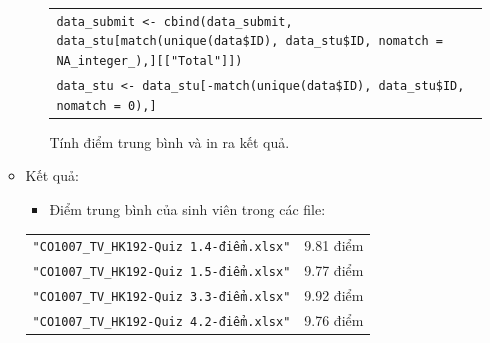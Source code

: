 \documentclass[a4paper]{article}
\theoremstyle{definition}
\begin{document}
\begin{enumerate}[a)]
\begin{itemize}
\begin{itemize}
\begin{center}
\begin{tabular}{p{13cm}}
                     \texttt{data\_submit <- cbind(data\_submit, data\_stu[match(unique(data\$ID), data\_stu\$ID, nomatch = NA\_integer\_),][["Total"]])}\\
                     \texttt{data\_stu <- data\_stu[-match(unique(data\$ID), data\_stu\$ID, nomatch = 0),]}
                \end{tabular}
            \end{center}
            Tính điểm trung bình và in ra kết quả.
        \end{itemize}
        \item Kết quả:
        \begin{itemize}
            \item Điểm trung bình của sinh viên trong các file:
        \end{itemize}
        \begin{center}
            \begin{tabular}{l l}
                 \texttt{"CO1007\_TV\_HK192-Quiz 1.4-điểm.xlsx"} & 9.81 điểm\\ 
                 \texttt{"CO1007\_TV\_HK192-Quiz 1.5-điểm.xlsx"} & 9.77 điểm\\ 
                 \texttt{"CO1007\_TV\_HK192-Quiz 3.3-điểm.xlsx"} & 9.92 điểm\\ 
                 \texttt{"CO1007\_TV\_HK192-Quiz 4.2-điểm.xlsx"} & 9.76 điểm\\ 
            \end{tabular}
        \end{center}
            
    \end{itemize}
\end{enumerate}
\end{document}
